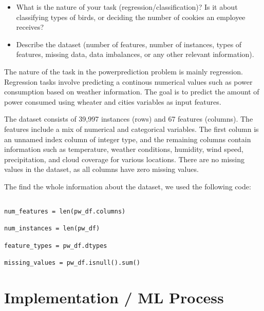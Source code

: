 \documentclass[a4, 10 pt, conference]{ieeeconf}  %
\begin{document}
{\color{blue}

  \begin{itemize}
    \item What is the nature of your task (regression/classification)? Is it about classifying types of birds, or deciding the number of cookies an employee receives?
    \item Describe the dataset (number of features, number of instances, types of features, missing data, data imbalances, or any other relevant information).




  \end{itemize}
}


The nature of the task in the powerprediction problem is mainly regression. Regression tasks involve predicting a continous numerical values such as power consumption based on weather information. The goal is to predict the amount of power consumed using wheater and cities variables as input features.

The dataset consists of 39,997 instances (rows) and 67 features (columns). The features include a mix of numerical and categorical variables. The first column is an unnamed index column of integer type, and the remaining columns contain information such as temperature, weather conditions, humidity, wind speed, precipitation, and cloud coverage for various locations. There are no missing values in the dataset, as all columns have zero missing values.

The find the whole information about the dataset, we used the following code:

\begin{verbatim}

num_features = len(pw_df.columns)

num_instances = len(pw_df)

feature_types = pw_df.dtypes

missing_values = pw_df.isnull().sum()

\end{verbatim}







\section{Implementation / ML Process}
\label{sec:methods}
\end{document}
